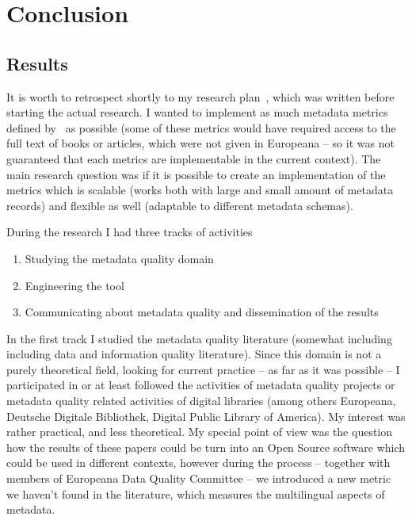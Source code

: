 \chapter{Conclusion}

\section{Results}

It is worth to retrospect shortly to my research plan~\cite{kiraly2015a}, which was written before starting the actual research. I wanted to implement as much metadata metrics defined by~\cite{bruce-hillmann2004, ochoa-duval2009} as possible (some of these metrics would have required access to the full text of books or articles, which were not given in Europeana -- so it was not guaranteed that each metrics are implementable in the current context). The main research question was if it is possible to create an implementation of the metrics which is scalable (works both with large and small amount of metadata records) and flexible as well (adaptable to different metadata schemas).

During the research I had three tracks of activities

\begin{enumerate}
  \setlength{\parskip}{0pt}
  \setlength{\itemsep}{0pt plus 1pt}
\item Studying the metadata quality domain
\item Engineering the tool
\item Communicating about metadata quality and dissemination of the results
\end{enumerate}

In the first track I studied the metadata quality literature (somewhat including including data and information quality literature). Since this domain is not a purely theoretical field, looking for current practice -- as far as it was possible -- I participated in or at least followed the activities of metadata quality projects or metadata quality related activities of digital libraries (among others Europeana, Deutsche Digitale Bibliothek, Digital Public Library of America). My interest was rather practical, and less theoretical. My special point of view was the question how the results of these papers could be turn into an Open Source software which could be used in different contexts, however during the process -- together with members of Europeana Data Quality Committee -- we introduced a new metric we haven't found in the literature, which measures the multilingual aspects of metadata.

